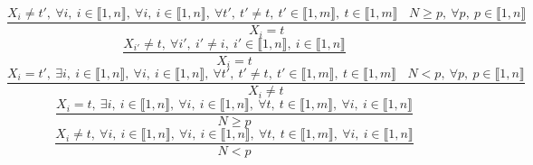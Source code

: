 $$\frac{X_{i} \neq t',~\forall i,~i \in \llbracket1,n\rrbracket,~\forall i,~i \in \llbracket1,n\rrbracket,~\forall t',~t' \neq t,~t' \in \llbracket1,m\rrbracket,~t \in \llbracket1,m\rrbracket~~~~N \geq p,~\forall p,~p \in \llbracket1,n\rrbracket}{X_{i}=t}$$ $$\frac{X_{i'} \neq t,~\forall i',~i' \neq i,~i' \in \llbracket1,n\rrbracket,~i \in \llbracket1,n\rrbracket}{X_{i}=t}$$ $$\frac{X_{i}=t',~\exists i,~i \in \llbracket1,n\rrbracket,~\forall i,~i \in \llbracket1,n\rrbracket,~\forall t',~t' \neq t,~t' \in \llbracket1,m\rrbracket,~t \in \llbracket1,m\rrbracket~~~~N<p,~\forall p,~p \in \llbracket1,n\rrbracket}{X_{i} \neq t}$$ $$\frac{X_{i}=t,~\exists i,~i \in \llbracket1,n\rrbracket,~\forall i,~i \in \llbracket1,n\rrbracket,~\forall t,~t \in \llbracket1,m\rrbracket,~\forall i,~i \in \llbracket1,n\rrbracket}{N \geq p}$$ $$\frac{X_{i} \neq t,~\forall i,~i \in \llbracket1,n\rrbracket,~\forall i,~i \in \llbracket1,n\rrbracket,~\forall t,~t \in \llbracket1,m\rrbracket,~\forall i,~i \in \llbracket1,n\rrbracket}{N<p}$$ 
